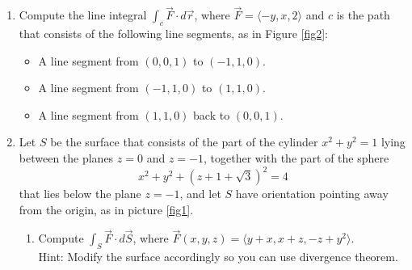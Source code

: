\documentclass[12pt]{article}
\newcommand{\vr}{\vec{r}{}}
\newcommand{\vF}{\vec{F}}
\renewcommand{\lg}{\langle}
\newcommand{\rg}{\rangle}
\newcommand{\n}{\nabla}
\newcommand{\Fline}{\vF\cdot d\vr}
\let \div\undefined
\DeclareMathOperator{\div}{div}
\begin{document}
\begin{enumerate}

\vfill


\item Compute the line integral $\int_c \Fline$, where $\vF=\lg -y,x,2\rg$ and $c$ is the path that consists of the following line segments, as in Figure \ref{fig2}:
\begin{itemize}
\item A line segment from $(0,0,1)$ to $(-1,1,0)$.
\item A line segment from $(-1,1,0)$ to $(1,1,0)$.
\item A line segment from $(1,1,0)$  back to $(0,0,1)$.
\end{itemize}

\vfill
\newpage

\item Let $S$ be the surface that consists of the part of the cylinder $x^2+y^2=1$ lying between the planes $z=0$ and $z=-1$, together with the part of the sphere $$x^2+y^2+(z+1+\sqrt{3})^2=4$$ that lies below the plane $z=-1$, and let $S$ have orientation pointing away from the origin, as in picture \ref{fig1}. 

\begin{enumerate}
\item Compute $\int_S \vF\cdot d\vec{S}$, where $\vF(x,y,z)=\langle y+x, x+z,-z+y^2\rangle$.\\
 Hint: Modify the surface accordingly so you can use divergence theorem.


\end{enumerate}
\end{enumerate}
\end{document}
